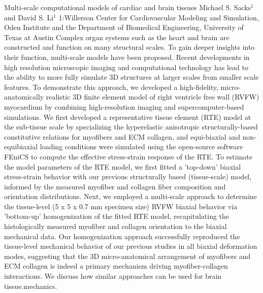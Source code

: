 \vspace{1.5ex}
\abs
{Multi-scale computational models of cardiac and brain tissues}
{Michael S. Sacks$^{1}$ and David S. Li$^{1}$}
{1:Willerson Center for Cardiovascular Modeling and Simulation, Oden Institute and the Department of Biomedical Engineering, University of Texas at Austin }
{Complex organ systems such as the heart and brain are constructed and function on many structural scales.  To gain deeper insights into their function, multi-scale models have been proposed. Recent developments in high resolution microscopic imaging and computational technology has lead to the ability to more fully simulate 3D structures at larger scales from smaller scale features.  To demonstrate this approach, we developed a high-fidelity, micro-anatomically realistic 3D finite element model of right ventricle free wall (RVFW) myocardium by combining high-resolution imaging and supercomputer-based simulations. We first developed a representative tissue element (RTE) model at the sub-tissue scale by specializing the hyperelastic anisotropic structurally-based constitutive relations for myofibers and ECM collagen, and equi-biaxial and non-equibiaxial loading conditions were simulated using the open-source software FEniCS to compute the effective stress-strain response of the RTE. To estimate the model parameters of the RTE model, we first fitted a 'top-down' biaxial stress-strain behavior with our previous structurally based (tissue-scale) model, informed by the measured myofiber and collagen fiber composition and orientation distributions. Next, we employed a multi-scale approach to determine the tissue-level (5 x 5 x 0.7 mm specimen size) RVFW biaxial behavior via 'bottom-up' homogenization of the fitted RTE model, recapitulating the histologically measured myofiber and collagen orientation to the biaxial mechanical data. Our homogenization approach successfully reproduced the tissue-level mechanical behavior of our previous studies in all biaxial deformation modes, suggesting that the 3D micro-anatomical arrangement of myofibers and ECM collagen is indeed a primary mechanism driving myofiber-collagen interactions.  We discuss how similar approaches can be used for brain tissue.mechanics.}



